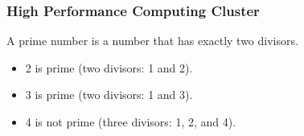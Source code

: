 \documentclass[]{beamer}
\begin{document}
\begin{frame}
  \frametitle{High Performance Computing Cluster}
  \begin{definition}
    A \alert{prime number} is a number that has exactly two divisors.
  \end{definition}
  \begin{example}
    \begin{itemize}
    \item 2 is prime (two divisors: 1 and 2).
    \item 3 is prime (two divisors: 1 and 3).
    \item 4 is not prime (\alert{three} divisors: 1, 2, and 4).
    \end{itemize}
  \end{example}
\end{frame}
\end{document}
